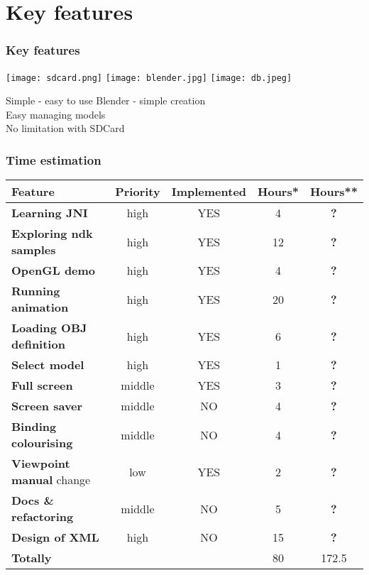\section{Key features} %
\label{sec:use_label_otherwise no content}
\begin{frame}\frametitle{Key features} 
\texttt{[image: sdcard.png]}
\texttt{[image: blender.jpg]}
\texttt{[image: db.jpeg]}
  \begin{block}{Simple - easy to use}
   Blender - simple creation \\
   Easy managing models \\
   No limitation with SDCard
  \end{block}
\end{frame}

\begin{frame}\frametitle{Time estimation} 
\begin{tabular}{| l || c | c |  c | c |}
\hline
Feature & Priority & Implemented & Hours* & Hours**\\
\hline
\hline
\textbf{Learning JNI} & high & YES &                 4 & {\bf ?} \\
\textbf{Exploring ndk samples} & high & YES &       12 &  {\bf ?} \\
\textbf{OpenGL demo} & high & YES &                  4 & {\bf ?} \\
\textbf{Running animation} & high & YES &           20 & {\bf ?} \\
\textbf{Loading OBJ definition} & high & YES &       6 &  {\bf ?} \\
\textbf{Select model} & high & YES &                 1 & {\bf ?} \\
\textbf{Full screen} & middle & YES &                3 &  {\bf ?} \\
\textbf{Screen saver} & middle & NO &                4 & {\bf ?} \\
\textbf{Binding colourising} & middle & NO &         4 & {\bf ?} \\
\textbf{Viewpoint manual} change & low & YES &       2 & {\bf ?} \\
\textbf{Docs \& refactoring} & middle & NO &         5 & {\bf ?} \\
\textbf{Design of XML} & high & NO &                15 & {\bf ?} \\
\hline
\textbf{Totally} &  & &                               80 & 172.5 \\
\hline
\end{tabular}
\end{frame}

